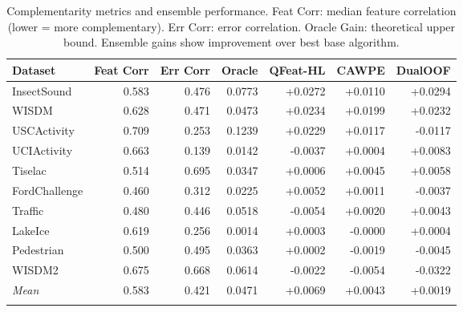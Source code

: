 \begin{table}[t]
\caption{Complementarity metrics and ensemble performance. Feat Corr: median feature correlation (lower = more complementary). Err Corr: error correlation. Oracle Gain: theoretical upper bound. Ensemble gains show improvement over best base algorithm.}\label{tab:complementarity_summary}
\centering
\small
\begin{tabular}{lrrrrrr}
\toprule
Dataset & Feat Corr & Err Corr & Oracle & QFeat-HL & CAWPE & DualOOF \\
\midrule
InsectSound          & 0.583 & 0.476 & 0.0773 & +0.0272 & +0.0110 & +0.0294 \\
WISDM                & 0.628 & 0.471 & 0.0473 & +0.0234 & +0.0199 & +0.0232 \\
USCActivity          & 0.709 & 0.253 & 0.1239 & +0.0229 & +0.0117 & -0.0117 \\
UCIActivity          & 0.663 & 0.139 & 0.0142 & -0.0037 & +0.0004 & +0.0083 \\
Tiselac              & 0.514 & 0.695 & 0.0347 & +0.0006 & +0.0045 & +0.0058 \\
FordChallenge        & 0.460 & 0.312 & 0.0225 & +0.0052 & +0.0011 & -0.0037 \\
Traffic              & 0.480 & 0.446 & 0.0518 & -0.0054 & +0.0020 & +0.0043 \\
LakeIce              & 0.619 & 0.256 & 0.0014 & +0.0003 & -0.0000 & +0.0004 \\
Pedestrian           & 0.500 & 0.495 & 0.0363 & +0.0002 & -0.0019 & -0.0045 \\
WISDM2               & 0.675 & 0.668 & 0.0614 & -0.0022 & -0.0054 & -0.0322 \\
\midrule
\textit{Mean} & 0.583 & 0.421 & 0.0471 & +0.0069 & +0.0043 & +0.0019 \\
\botrule
\end{tabular}
\end{table}